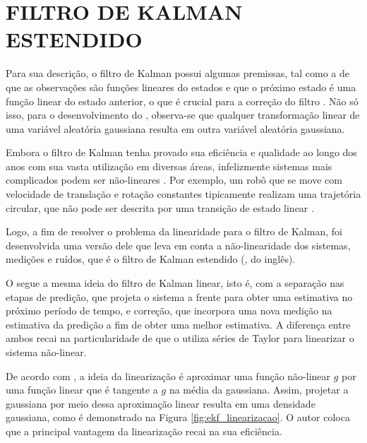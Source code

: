 \documentclass[acronym, symbols, table]{fei}
\begin{document}
		\section{FILTRO DE KALMAN ESTENDIDO}
			
			Para sua descrição, o filtro de Kalman possui algumas premissas, tal como a de que as observações são funções lineares do estados e que o próximo estado é uma função linear do estado anterior, o que é crucial para a correção do filtro \cite{thrun2002probabilistic}. Não só isso, para o desenvolvimento do , observa-se que qualquer transformação linear de uma variável aleatória gaussiana resulta em outra variável aleatória gaussiana. 
			
			Embora o filtro de Kalman tenha provado sua eficiência e qualidade ao longo dos anos com sua vasta utilização em diversas áreas, infelizmente sistemas mais complicados podem ser não-lineares \cite{khodarahmi2023review}. Por exemplo, um robô que se move com velocidade de translação e rotação constantes tipicamente realizam uma trajetória circular, que não pode ser descrita por uma transição de estado linear \cite{thrun2002probabilistic}.
			
			Logo, a fim de resolver o problema da linearidade para o filtro de Kalman, foi desenvolvida uma versão dele que leva em conta a não-linearidade dos sistemas, medições e ruídos, que é o filtro de Kalman estendido (, do inglês).
			
			O  segue a mesma ideia do filtro de Kalman linear, isto é, com a separação nas etapas de predição, que projeta o sistema a frente para obter uma estimativa no próximo período de tempo, e correção, que incorpora uma nova medição na estimativa da predição a fim de obter uma melhor estimativa. A diferença entre ambos recai na particularidade de que o  utiliza séries de Taylor para linearizar o sistema não-linear.
			
			De acordo com \textcite{thrun2002probabilistic}, a ideia da linearização é aproximar uma função não-linear $g$ por uma função linear que é tangente a $g$ na média da gaussiana. Assim, projetar a gaussiana por meio dessa aproximação linear resulta em uma densidade gaussiana, como é demonstrado na Figura \ref{fig:ekf_linearizacao}. O autor coloca que a principal vantagem da linearização recai na sua eficiência.
			
\end{document}
